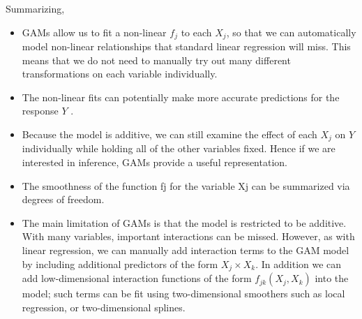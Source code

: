 \documentclass[11pt, a4paper]{article}
\begin{document}
    Summarizing,
    \begin{itemize}
        \item GAMs allow us to fit a non-linear $f_{j}$ to each $X_{j}$, so that we can automatically model non-linear relationships that standard linear regression will miss. This means that we do not need to manually try out many different transformations on each variable individually.
        \item The non-linear fits can potentially make more accurate predictions for the response $Y$ .
        \item Because the model is additive, we can still examine the effect of each $X_{j}$ on $Y$ individually while holding all of the other variables fixed. Hence if we are interested in inference, GAMs provide a useful representation.
        \item The smoothness of the function fj for the variable Xj can be summarized via degrees of freedom.
        \item The main limitation of GAMs is that the model is restricted to be additive. With many variables, important interactions can be missed. However, as with linear regression, we can manually add interaction terms to the GAM model by including additional predictors of the form $X_{j} \times X_{k}$. In addition we can add low-dimensional interaction functions of the form $f_{jk}(X_{j}, X_{k})$ into the model; such terms can be fit using two-dimensional smoothers such as local regression, or two-dimensional splines.
    \end{itemize}


\end{document}
